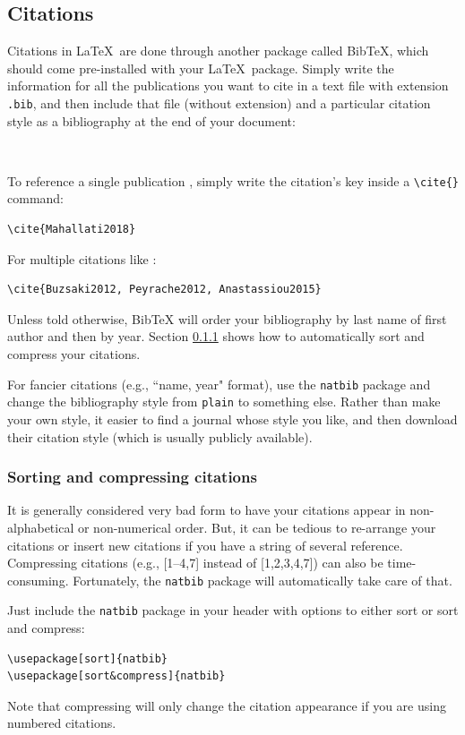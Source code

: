 \documentclass[12pt]{article}
\begin{document}
\subsection{Citations}
Citations in \LaTeX \ are done through another package called BibTeX, which should come pre-installed with your \LaTeX\ package. Simply write the information for all the publications you want to cite in a text file with extension \texttt{.bib}, and then include that file (without extension) and a particular citation style as a bibliography at the end of your document:

\begin{verbatim}


\end{verbatim}

To reference a single publication \citep{Mahallati2018}, simply write the citation's key inside a \verb!\cite{}! command:
\begin{verbatim}
\cite{Mahallati2018}
\end{verbatim}
For multiple citations like \cite{Buzsaki2012, Peyrache2012, Mahallati2018a}:
\begin{verbatim}
\cite{Buzsaki2012, Peyrache2012, Anastassiou2015}
\end{verbatim}
Unless told otherwise, BibTeX will order your bibliography by last name of first author and then by year. Section \ref{sec:citeorder} shows how to automatically sort and compress your citations.

For fancier citations (e.g., ``name, year" format), use the \verb!natbib! package and change the bibliography style from \verb!plain! to something else. Rather than make your own style, it easier to find a journal whose style you like, and then download their citation style (which is usually publicly available).

\subsubsection{Sorting and compressing citations} \label{sec:citeorder}
It is generally considered very bad form to have your citations appear in non-alphabetical or non-numerical order. But, it can be tedious to re-arrange your citations or insert new citations if you have a string of several reference. Compressing citations (e.g., [1--4,7] instead of [1,2,3,4,7]) can also be time-consuming. Fortunately, the \texttt{natbib} package will automatically take care of that.

Just include the \texttt{natbib} package in your header with options to either sort or sort and compress:
\begin{verbatim}
\usepackage[sort]{natbib}
\usepackage[sort&compress]{natbib}
\end{verbatim}
Note that compressing will only change the citation appearance if you are using numbered citations.
\end{document}
